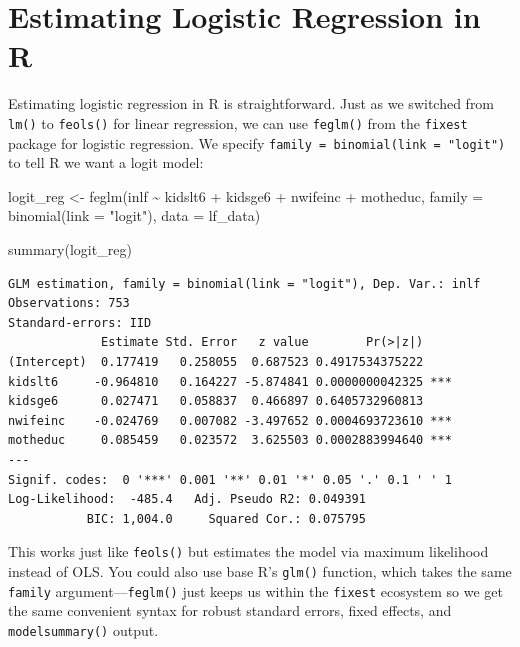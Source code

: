 \documentclass[
  letterpaper,
  DIV=11,
  numbers=noendperiod]{scrreprt}
\newenvironment{Shaded}{\begin{snugshade}}{\end{snugshade}}
\newcommand{\AttributeTok}[1]{\textcolor[rgb]{0.40,0.45,0.13}{#1}}
\newcommand{\FunctionTok}[1]{\textcolor[rgb]{0.28,0.35,0.67}{#1}}
\newcommand{\NormalTok}[1]{\textcolor[rgb]{0.00,0.23,0.31}{#1}}
\newcommand{\OtherTok}[1]{\textcolor[rgb]{0.00,0.23,0.31}{#1}}
\newcommand{\SpecialCharTok}[1]{\textcolor[rgb]{0.37,0.37,0.37}{#1}}
\newcommand{\StringTok}[1]{\textcolor[rgb]{0.13,0.47,0.30}{#1}}
\begin{document}
\section{Estimating Logistic Regression in
R}\label{estimating-logistic-regression-in-r}

Estimating logistic regression in R is straightforward. Just as we
switched from \texttt{lm()} to \texttt{feols()} for linear regression,
we can use \texttt{feglm()} from the \texttt{fixest} package for
logistic regression. We specify
\texttt{family\ =\ binomial(link\ =\ "logit")} to tell R we want a logit
model:

\begin{Shaded}
\begin{Highlighting}[]
\NormalTok{logit\_reg }\OtherTok{\textless{}{-}} \FunctionTok{feglm}\NormalTok{(inlf }\SpecialCharTok{\textasciitilde{}}\NormalTok{ kidslt6 }\SpecialCharTok{+}\NormalTok{ kidsge6 }\SpecialCharTok{+}\NormalTok{ nwifeinc }\SpecialCharTok{+}\NormalTok{ motheduc,}
    \AttributeTok{family =} \FunctionTok{binomial}\NormalTok{(}\AttributeTok{link =} \StringTok{"logit"}\NormalTok{),}
    \AttributeTok{data =}\NormalTok{ lf\_data)}

\FunctionTok{summary}\NormalTok{(logit\_reg)}
\end{Highlighting}
\end{Shaded}

\begin{verbatim}
GLM estimation, family = binomial(link = "logit"), Dep. Var.: inlf
Observations: 753
Standard-errors: IID 
             Estimate Std. Error   z value        Pr(>|z|)    
(Intercept)  0.177419   0.258055  0.687523 0.4917534375222    
kidslt6     -0.964810   0.164227 -5.874841 0.0000000042325 ***
kidsge6      0.027471   0.058837  0.466897 0.6405732960813    
nwifeinc    -0.024769   0.007082 -3.497652 0.0004693723610 ***
motheduc     0.085459   0.023572  3.625503 0.0002883994640 ***
---
Signif. codes:  0 '***' 0.001 '**' 0.01 '*' 0.05 '.' 0.1 ' ' 1
Log-Likelihood:  -485.4   Adj. Pseudo R2: 0.049391
           BIC: 1,004.0     Squared Cor.: 0.075795
\end{verbatim}

This works just like \texttt{feols()} but estimates the model via
maximum likelihood instead of OLS. You could also use base R's
\texttt{glm()} function, which takes the same \texttt{family}
argument---\texttt{feglm()} just keeps us within the \texttt{fixest}
ecosystem so we get the same convenient syntax for robust standard
errors, fixed effects, and \texttt{modelsummary()} output.
\end{document}
